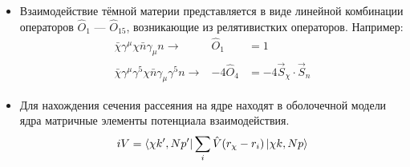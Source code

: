\begin{itemize}
	\item Взаимодействие тёмной материи представляется в виде линейной комбинации операторов $\hat{O}_1$ --- $\hat{O}_{15}$, возникающие из релятивистких операторов. Например:
	\begin{eqnarray*}
		\bar{\chi}\gamma^{\mu}\chi \bar{n}\gamma_{\mu}n \rightarrow& \hat{O}_1 &= 1 \\
		\bar{\chi}\gamma^{\mu}\gamma^{5}\chi \bar{n}\gamma_{\mu}\gamma^{5}n \rightarrow& -4\hat{O}_4  &= -4 \vec{S}_{\chi}\cdot\vec{S}_{n}
	\end{eqnarray*}
	\item Для нахождения сечения рассеяния на ядре находят в оболочечной модели ядра матричные элементы 
	потенциала взаимодействия.
	\begin{equation*}
		iV = \bra{\chi k',N p'} \sum_i{\hat{V}(r_{\chi} - r_{i})} \ket{\chi k,N p}
	\end{equation*}
\end{itemize}